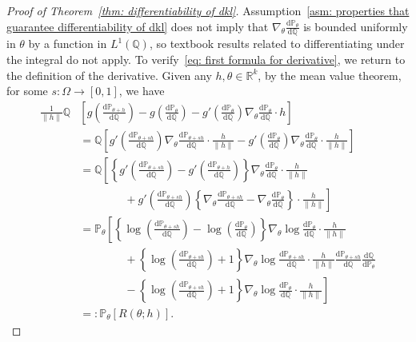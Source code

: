 \documentclass[reqno]{amsart}
\newcommand{\Real}{\mathbb{R}}
\newcommand{\1}{\mathds{1}}
\renewcommand{\d}{\mathrm{d}}
\newcommand{\grad}{\nabla}
\renewcommand{\P}{\mathds{P}}
\newcommand{\Q}{\mathds{Q}}
\theoremstyle{definition}
\theoremstyle{remark}
\begin{document}
\begin{proof}[Proof of Theorem~\ref{thm: differentiability of dkl}]
  
  Assumption~\ref{asm: properties that guarantee differentiability of dkl} does not imply that $\grad_\theta   \frac{\d \P_\theta}{\d \Q}$ is bounded uniformly in $\theta$ by a function in $L^1(\Q)$, so textbook results related to differentiating under the integral do not apply. To verify~\eqref{eq: first formula for derivative}, we return to the definition of the derivative. Given any $h,\theta \in \Real^k$, by the mean value theorem, for some $s: \Omega \rightarrow [0,1]$, we have
  \begin{align*} 
   \frac{1}{\lVert h \rVert} \Q &\left [ g \left (  \frac{\d \P_{\theta + h}}{\d \Q} \right )  -  g \left (  \frac{\d \P_\theta}{\d \Q} \right ) -  g' \left (  \frac{\d \P_\theta}{\d \Q} \right ) \grad_\theta \frac{\d \P_\theta}{\d \Q} \cdot h\right ] \\
    &= \Q \left [  g' \left (  \frac{\d \P_{\theta+s h}}{\d \Q} \right ) \grad_\theta \frac{\d \P_{\theta+s h}}{\d \Q} \cdot \frac{h}{\lVert h \rVert} -  g' \left (  \frac{\d \P_\theta}{\d \Q} \right ) \grad_\theta \frac{\d \P_\theta}{\d \Q} \cdot \frac{h}{\lVert h \rVert} \right ] \\
    &= \Q \left [ \left \{  g' \left (  \frac{\d \P_{\theta+s h}}{\d \Q} \right ) - g' \left (  \frac{\d \P_{\theta+h}}{\d \Q} \right ) \right \}  \grad_\theta \frac{\d \P_\theta}{\d \Q} \cdot \frac{h}{\lVert h \rVert} \right . \\
    &\qquad \qquad + \left . g' \left (  \frac{\d \P_{\theta+s h}}{\d \Q} \right ) \left \{\grad_\theta \frac{\d \P_{\theta+s h}}{\d \Q} - \grad_\theta \frac{\d \P_{\theta}}{\d \Q} \right \}  \cdot \frac{h}{\lVert h \rVert}\right ]\\
    &= \P_\theta \left [ \left \{ \log \left (  \frac{\d \P_{\theta+s h}}{\d \Q} \right ) - \log \left (  \frac{\d \P_{\theta}}{\d \Q} \right ) \right \}  \grad_\theta \log \frac{\d \P_\theta}{\d \Q} \cdot \frac{h}{\lVert h \rVert} \right . \\
    &\qquad \qquad +  \left \{\log \left (  \frac{\d \P_{\theta+s h}}{\d \Q} \right ) + 1 \right \} \grad_\theta \log \frac{\d \P_{\theta+s h}}{\d \Q}  \cdot \frac{h}{\lVert h \rVert}  \frac{\d \P_{\theta+s h}}{\d \Q} \frac{\d \Q}{\d \P_\theta}   \\
                 &\qquad \qquad - \left .  \left \{\log \left (  \frac{\d \P_{\theta+s h}}{\d \Q} \right ) + 1 \right \} \grad_\theta \log \frac{\d \P_{\theta}}{\d \Q}  \cdot \frac{h}{\lVert h \rVert}\right ]\\
   &=: \P_\theta [R(\theta; h)]. 
  \end{align*}


\end{proof}
\end{document}

